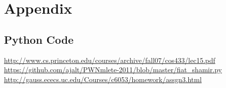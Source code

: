 \documentclass[10pt]{article}
\begin{document}
\newpage
\section{Appendix}
    \subsection{Python Code}
    
    
    
    
    
    
    
    

\newpage
\begin{thebibliography}{9}
     \url{http://www.cs.princeton.edu/courses/archive/fall07/cos433/lec15.pdf}
     \url{https://github.com/ajalt/PWNmlete-2011/blob/master/fiat_shamir.py}
     \url{http://gauss.ececs.uc.edu/Courses/c6053/homework/assgn3.html}
\end{thebibliography}
\end{document}
